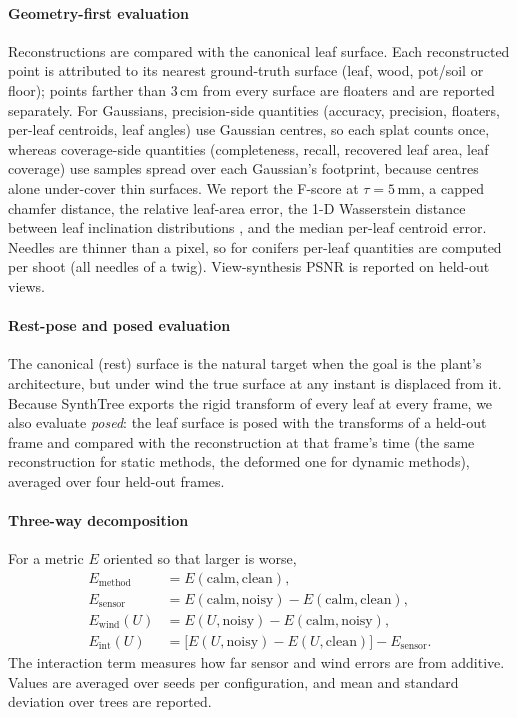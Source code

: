 \documentclass[preprint,11pt,authoryear]{elsarticle}
\begin{document}
\paragraph{Geometry-first evaluation} Reconstructions are compared with the canonical leaf surface. Each reconstructed point is attributed to its nearest ground-truth surface (leaf, wood, pot/soil or floor); points farther than 3\,cm from every surface are floaters and are reported separately. For Gaussians, precision-side quantities (accuracy, precision, floaters, per-leaf centroids, leaf angles) use Gaussian centres, so each splat counts once, whereas coverage-side quantities (completeness, recall, recovered leaf area, leaf coverage) use samples spread over each Gaussian's footprint, because centres alone under-cover thin surfaces. We report the F-score at $\tau = 5$\,mm, a capped chamfer distance, the relative leaf-area error, the 1-D Wasserstein distance between leaf inclination distributions \citep{ross1981radiation}, and the median per-leaf centroid error. Needles are thinner than a pixel, so for conifers per-leaf quantities are computed per shoot (all needles of a twig). View-synthesis PSNR is reported on held-out views.

\paragraph{Rest-pose and posed evaluation} The canonical (rest) surface is the natural target when the goal is the plant's architecture, but under wind the true surface at any instant is displaced from it. Because SynthTree exports the rigid transform of every leaf at every frame, we also evaluate \emph{posed}: the leaf surface is posed with the transforms of a held-out frame and compared with the reconstruction at that frame's time (the same reconstruction for static methods, the deformed one for dynamic methods), averaged over four held-out frames.

\paragraph{Three-way decomposition} For a metric $E$ oriented so that larger is worse,
\begin{align}
E_{\text{method}} &= E(\text{calm}, \text{clean}), \\
E_{\text{sensor}} &= E(\text{calm}, \text{noisy}) - E(\text{calm}, \text{clean}), \\
E_{\text{wind}}(U) &= E(U, \text{noisy}) - E(\text{calm}, \text{noisy}), \\
E_{\text{int}}(U) &= \big[E(U,\text{noisy}) - E(U,\text{clean})\big] - E_{\text{sensor}}.
\end{align}
The interaction term measures how far sensor and wind errors are from additive. Values are averaged over seeds per configuration, and mean and standard deviation over trees are reported.
\end{document}
